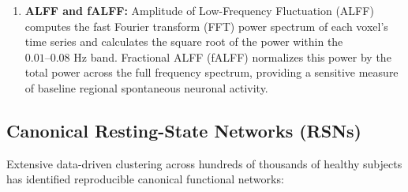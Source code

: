 \documentclass[11pt,a4paper]{article}
\begin{document}
\begin{enumerate}[leftmargin=2em]
\begin{itemize}
        \item \textbf{Clustering Coefficient ($C_i$):} The fraction of triangles that exist around node $i$, quantifying local network segregation and modular information processing:
        \begin{equation}
            C_i = \frac{2 e_i}{k_i(k_i - 1)}
        \end{equation}
        \item \textbf{Characteristic Path Length ($L$):} The average shortest path length between all pairs of nodes, quantifying global network integration:
        \begin{equation}
            L = \frac{1}{N(N-1)} \sum_{i \neq j} d(i, j)
        \end{equation}
        The human brain exhibits a \textbf{Small-World Architecture}, characterized by high local clustering ($C \gg C_{\text{random}}$) coupled with short path lengths ($L \approx L_{\text{random}}$), balancing local specialization with rapid global cognitive integration.
    \end{itemize}
    \item \textbf{ALFF and fALFF:} Amplitude of Low-Frequency Fluctuation (ALFF) computes the fast Fourier transform (FFT) power spectrum of each voxel's time series and calculates the square root of the power within the $0.01\text{--}0.08\text{ Hz}$ band. Fractional ALFF (fALFF) normalizes this power by the total power across the full frequency spectrum, providing a sensitive measure of baseline regional spontaneous neuronal activity.
\end{enumerate}

\subsection{Canonical Resting-State Networks (RSNs)}
Extensive data-driven clustering across hundreds of thousands of healthy subjects has identified reproducible canonical functional networks:
\end{document}
